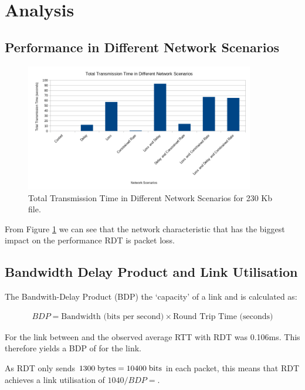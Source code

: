\section{Analysis}

\subsection{Performance in Different Network Scenarios}
\label{sec:performance}

\begin{figure}[H]
\begin{center}
    \includegraphics[width=100mm]{images/performance-network-scenarios.png}
\end{center}
\caption{Total Transmission Time in Different Network Scenarios for 230 Kb file.}\label{fig:performance}
\end{figure}

From Figure \ref{fig:performance} we can see that the network characteristic that has the biggest impact on the performance RDT is packet loss. 

\subsection{Bandwidth Delay Product and Link Utilisation}

The Bandwith-Delay Product (BDP) the `capacity' of a link and is calculated as:

\begin{align*}
    BDP = \text{Bandwidth (bits per second)} \times \text{Round Trip Time (seconds)}
\end{align*}

For the link between  and  the observed average RTT with RDT was 0.106ms. This therefore yields a BDP of for the link.

As RDT only sends $1300 \text{\;bytes} = 10400 \text{\;bits}$ in each packet, this means that RDT achieves a link utilisation of $1040 / BDP = $.

